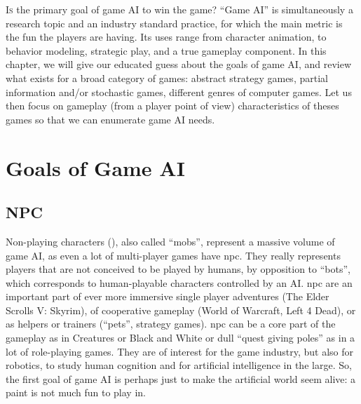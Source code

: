 \lettrine{I}{s} the primary goal of game AI to win the game? ``Game AI'' is simultaneously a research topic and an industry standard practice, for which the main metric is the fun the players are having. Its uses range from character animation, to behavior modeling, strategic play, and a true gameplay component. In this chapter, we will give our educated guess about the goals of game AI, and review what exists for a broad category of games: abstract strategy games, partial information and/or stochastic games, different genres of computer games. Let us then focus on gameplay (from a player point of view) characteristics of theses games so that we can enumerate game AI needs. %


\section{Goals of Game AI}
\subsection{NPC}
Non-playing characters (), also called ``mobs'', represent a massive volume of game AI, as even a lot of multi-player games have \gls{npc}. They really represents players that are not conceived to be played by humans, by opposition to ``bots'', which corresponds to human-playable characters controlled by an AI. \gls{npc} are an important part of ever more immersive single player adventures (The Elder Scrolls V: Skyrim), of cooperative gameplay (World of Warcraft, Left 4 Dead), or as helpers or trainers (``pets'', strategy games). \gls{npc} can be a core part of the gameplay as in Creatures or Black and White or dull ``quest giving poles'' as in a lot of role-playing games. They are of interest for the game industry, but also for robotics, to study human cognition and for artificial intelligence in the large. So, the first goal of game AI is perhaps just to make the artificial world seem alive: a paint is not much fun to play in.

